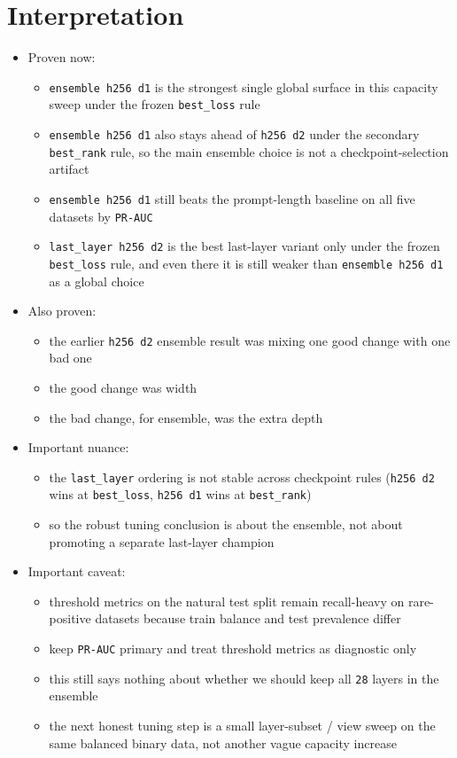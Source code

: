 \documentclass[11pt]{article}
\begin{document}
\section*{Interpretation}
\begin{itemize}[leftmargin=1.5em]
\item Proven now:
  \begin{itemize}[leftmargin=1.5em]
  \item \texttt{ensemble h256 d1} is the strongest single global surface in this capacity sweep under the frozen \texttt{best\_loss} rule
  \item \texttt{ensemble h256 d1} also stays ahead of \texttt{h256 d2} under the secondary \texttt{best\_rank} rule, so the main ensemble choice is not a checkpoint-selection artifact
  \item \texttt{ensemble h256 d1} still beats the prompt-length baseline on all five datasets by \texttt{PR-AUC}
  \item \texttt{last\_layer h256 d2} is the best last-layer variant only under the frozen \texttt{best\_loss} rule, and even there it is still weaker than \texttt{ensemble h256 d1} as a global choice
  \end{itemize}
\item Also proven:
  \begin{itemize}[leftmargin=1.5em]
  \item the earlier \texttt{h256 d2} ensemble result was mixing one good change with one bad one
  \item the good change was width
  \item the bad change, for ensemble, was the extra depth
  \end{itemize}
\item Important nuance:
  \begin{itemize}[leftmargin=1.5em]
  \item the \texttt{last\_layer} ordering is not stable across checkpoint rules (\texttt{h256 d2} wins at \texttt{best\_loss}, \texttt{h256 d1} wins at \texttt{best\_rank})
  \item so the robust tuning conclusion is about the ensemble, not about promoting a separate last-layer champion
  \end{itemize}
\item Important caveat:
  \begin{itemize}[leftmargin=1.5em]
  \item threshold metrics on the natural test split remain recall-heavy on rare-positive datasets because train balance and test prevalence differ
  \item keep \texttt{PR-AUC} primary and treat threshold metrics as diagnostic only
  \item this still says nothing about whether we should keep all \texttt{28} layers in the ensemble
  \item the next honest tuning step is a small layer-subset / view sweep on the same balanced binary data, not another vague capacity increase
  \end{itemize}
\end{itemize}
\end{document}
